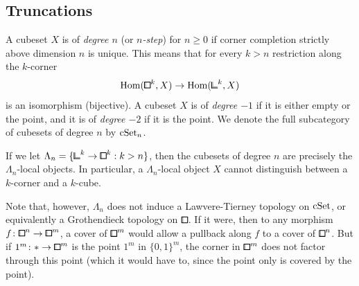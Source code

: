 \subsection{Truncations}\label{sec:truncation}



\begin{definition}\label{def:n-step}
A cubeset $X$ is of \emph{degree $n$} (or \emph{$n$-step}) for $n\geq 0$ if corner completion strictly above dimension $n$ is unique.
This means that for every $k > n$ restriction along the $k$-corner
\[
    \hom({\bbox}^k,X)\to\hom({\bbcor}^k,X)
\]
is an isomorphism (bijective).
A cubeset $X$ is of \emph{degree $-1$} if it is either empty or the point,
and it is of \emph{degree $-2$} if it is the point.
We denote the full subcategory of cubesets of degree $n$ by $\mathrm{cSet}_n$.
\end{definition}

\begin{remark}
If we let $\Lambda_n = \{{\bbcor}^k\to{\bbox}^k : k > n\}$, then the cubesets of degree $n$ are precisely the $\Lambda_n$-local objects.
In particular, a $\Lambda_n$-local object $X$ cannot distinguish between a $k$-corner and a $k$-cube.
\end{remark}

\begin{remark}\label{rem:corner-no-topology}
Note that, however, $\Lambda_n$ does not induce a Lawvere-Tierney topology on $\mathrm{cSet}$, or equivalently a Grothendieck topology on $\bbox$.
If it were, then to any morphism $f\colon{\bbox}^n\to{\bbox}^m$, a cover of ${\bbox}^m$ would allow a pullback along $f$ to a cover of ${\bbox}^n$.
But if $1^m\colon\ast\to{\bbox}^m$ is the point $1^m$ in $\{0,1\}^m$, the corner in ${\bbox}^m$ does not factor through this point (which it would have to, since the point only is covered by the point).
\end{remark}

